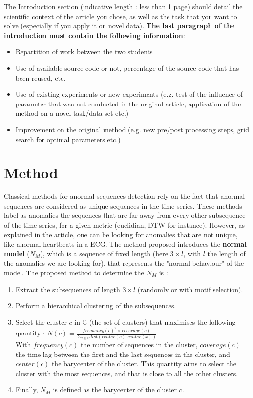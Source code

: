 \documentclass[11pt]{article}
\begin{document}
The Introduction section (indicative length : less than 1 page) should detail the scientific context of the article you chose, as well as the task that you want to solve (especially if you apply it on novel data). \textbf{The last paragraph of the introduction must contain the following information}:
\begin{itemize}
    \item Repartition of work between the two students
    \item Use of available source code or not, percentage of the source code that has been reused, etc.
    \item Use of existing experiments or new experiments (e.g. test of the influence of parameter that was not conducted in the original article, application of the method on a novel task/data set etc.)
    \item Improvement on the original method (e.g. new pre/post processing steps, grid search for optimal parameters etc.)
\end{itemize}

\section{Method}

Classical methods for anormal sequences detection rely on the fact that anormal sequences are considered as unique sequences in the time-series. 
These methods label as anomalies the sequences that are far away from every other subsequence of the time series, for a given metric (euclidian, DTW for instance). 
However, as explained in the article, one can be looking for anomalies that are not unique, like anormal heartbeats in a ECG.
The method proposed introduces the \textbf{normal model} ($N_M$), which is a sequence of fixed length (here $3 \times l $, with $l$ the length of the anomalies we are looking for), that represents the "normal behaviour" of the model. 
The proposed method to determine the $N_M$ is : 
\begin{enumerate}
    \item Extract the subsequences of length $3 \times l$  (randomly or with motif selection). 
    \item Perform a hierarchical clustering of the subsequences.
    \item Select the cluster $c$ in $\mathbb{C}$ (the set of clusters) that maximises the following quantity : $N(c) = \frac{frequency (c)^2 \times coverage (c) }{ \Sigma_{x \in \mathbb{C} } dist(center(c), center(x))}$\\
    With $frequency(c)$ the number of sequences in the cluster, $coverage(c)$ the time lag between the first and the last sequences in the cluster, and $center(c)$ the barycenter of the cluster.
    This quantity aims to select the cluster with the most sequences, and that is close to all the other clusters. 
    \item Finally, $N_M$ is defined as the barycenter of the cluster $c$.
\end{enumerate}
\end{document}
